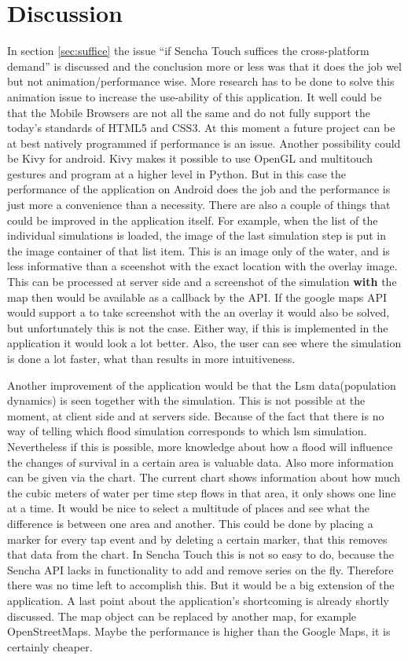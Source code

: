 \section{Discussion}
In section \ref{sec:suffice} the issue ``if Sencha Touch suffices the cross-platform demand'' is discussed and the conclusion more or less was that it does the job wel but not animation/performance wise. More research has to be done to solve this animation issue to increase the use-ability of this application. It well could be that the Mobile Browsers are not all the same and do not fully support the today's standards of HTML5 and CSS3. At this moment a future project can be at best natively programmed if performance is an issue. Another possibility could be Kivy \cite{kivy} for android. Kivy makes it possible to use OpenGL \cite{opengl} and multitouch gestures and program at a higher level in Python\cite{python}. But in this case the performance of the application on Android does the job and the performance is just more a convenience than a necessity. 
There are also a couple of things that could be improved in the application itself. For example, when the list of the individual simulations is loaded, the image of the last simulation step is put in the image container of that list item. This is an image only of the water, and is less informative than a sceenshot with the exact location with the overlay image. This can be processed at server side and a screenshot of the simulation \textbf{with} the map then would be available as a callback by the API. If the google maps API would support a to take screenshot with the an overlay it would also be solved, but unfortunately this is not the case. Either way, if this is implemented in the application it would look a lot better. Also, the user can see where the simulation is done a lot faster, what than results in more intuitiveness. 

Another improvement of the application would be that the Lsm data(population dynamics) is seen together with the simulation. This is not possible at the moment, at client side and at servers side. Because of the fact that there is no way of telling which flood simulation corresponds to which lsm simulation. Nevertheless if this is possible, more knowledge about how a flood will influence the changes of survival in a certain area is valuable data. Also more information can be given via the chart. The current chart shows information about how much the cubic meters of water per time step flows in that area, it only shows one line at a time. It would be nice to select a multitude of places and see what the difference is between one area and another. This could be done by placing a marker for every tap event and by deleting a certain marker, that this removes that data from the chart. In Sencha Touch this is not so easy to do, because the Sencha API lacks in functionality to add and remove series on the fly. Therefore there was no time left to accomplish this. But it would be a big extension of the application. 
A last point about the application's shortcoming is already shortly discussed. The map object can be replaced by another map, for example OpenStreetMaps. Maybe the performance is higher than the Google Maps, it is certainly cheaper. 

